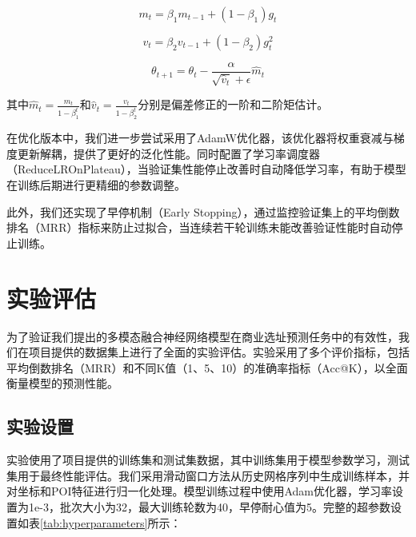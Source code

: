 \documentclass{article}
\begin{document}
\begin{equation}
m_t = \beta_1 m_{t-1} + (1-\beta_1) g_t
\end{equation}

\begin{equation}
v_t = \beta_2 v_{t-1} + (1-\beta_2) g_t^2
\end{equation}

\begin{equation}
\theta_{t+1} = \theta_t - \frac{\alpha}{\sqrt{\hat{v}_t} + \epsilon} \hat{m}_t
\end{equation}

其中$\hat{m}_t = \frac{m_t}{1-\beta_1^t}$和$\hat{v}_t = \frac{v_t}{1-\beta_2^t}$分别是偏差修正的一阶和二阶矩估计。

在优化版本中，我们进一步尝试采用了AdamW优化器\cite{loshchilov_decoupled_2019}，该优化器将权重衰减与梯度更新解耦，提供了更好的泛化性能。同时配置了学习率调度器（ReduceLROnPlateau），当验证集性能停止改善时自动降低学习率，有助于模型在训练后期进行更精细的参数调整。

此外，我们还实现了早停机制（Early Stopping），通过监控验证集上的平均倒数排名（MRR）指标来防止过拟合，当连续若干轮训练未能改善验证性能时自动停止训练。

\section{实验评估}

为了验证我们提出的多模态融合神经网络模型在商业选址预测任务中的有效性，我们在项目提供的数据集上进行了全面的实验评估。实验采用了多个评价指标，包括平均倒数排名（MRR）和不同K值（1、5、10）的准确率指标（Acc@K），以全面衡量模型的预测性能。

\subsection{实验设置}

实验使用了项目提供的训练集和测试集数据，其中训练集用于模型参数学习，测试集用于最终性能评估。我们采用滑动窗口方法从历史网格序列中生成训练样本，并对坐标和POI特征进行归一化处理。模型训练过程中使用Adam优化器，学习率设置为1e-3，批次大小为32，最大训练轮数为40，早停耐心值为5。完整的超参数设置如表\ref{tab:hyperparameters}所示：
\end{document}
